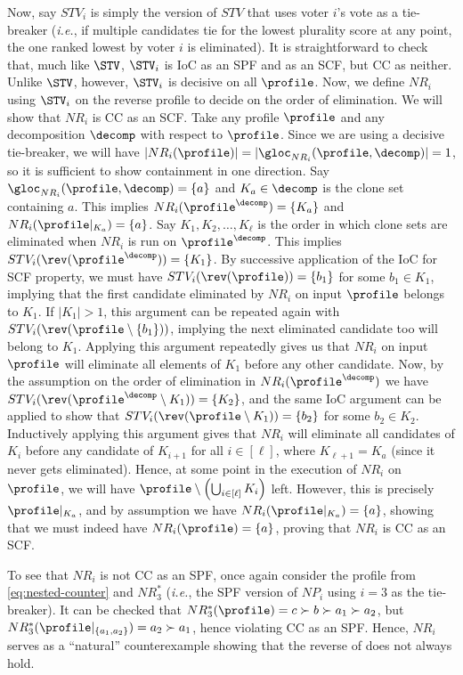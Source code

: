 Now, say $STV_i$ is simply the version of $STV$ that uses voter $i$'s vote as a tie-breaker (\emph{i.e.}, if multiple candidates tie for the lowest plurality score at any point, the one ranked lowest by voter $i$ is eliminated). It is straightforward to check that, much like $\STV$, $\STV_i$ is IoC as an SPF and as an SCF, but CC as neither. Unlike $\STV$, however, $\STV_i$ is decisive on all $\profile$. Now, we define $NR_i$ using $\STV_i$ on the reverse profile to decide on the order of elimination. We will show that $NR_i$ is CC as an SCF. Take any profile $\profile$ and any decomposition $\decomp$ with respect to $\profile$. Since we are using a decisive tie-breaker, we will have $|NR_{i}(\profile)|= |\gloc_{NR_i}(\profile, \decomp)|=1$, so it is sufficient to show containment in one direction. Say $\gloc_{NR_i}(\profile, \decomp)=\{a\}$ and $K_a \in \decomp$ is the clone set containing $a$. This implies $NR_i(\profile^{\decomp}) = \{K_a\}$ and $NR_i(\profile|_{K_a})=\{a\}$. Say $K_1,K_2,\ldots,K_{\ell}$ is the order in which clone sets are eliminated when $NR_i$ is run on $\profile^{\decomp}$. This implies $STV_i(\rev(\profile^{\decomp}))=\{K_1\}$. By successive application of the IoC for SCF property, we must have $STV_i(\rev(\profile))=\{b_1\}$ for some $b_1 \in K_1$, implying that the first candidate eliminated by $NR_i$ on input $\profile$ belongs to $K_1$. If $|K_1|>1$, this argument can be repeated again with $STV_i(\rev(\profile \setminus\{b_1\}))$, implying the next eliminated candidate too will belong to $K_1$. Applying this argument repeatedly gives us that $NR_i$ on input $\profile$ will eliminate all elements of $K_1$ before any other candidate. Now, by the assumption on the order of elimination in $NR_i(\profile^{\decomp})$ we have $STV_i(\rev(\profile^{\decomp} \setminus K_1))=\{K_2\}$, and the same IoC argument can be applied to show that $STV_i(\rev(\profile \setminus K_1))=\{b_2\}$ for some $b_2 \in K_2$. Inductively applying this argument gives that $NR_i$ will eliminate all candidates of $K_i$ before any candidate of $K_{i+1}$ for all $i \in [\ell]$, where $K_{\ell+1}=K_a$ (since it never gets eliminated). Hence, at some point in the execution of $NR_i$ on $\profile$, we will have $\profile \setminus \left( \bigcup_{i \in [\ell]} K_i \right)$ left. However, this is precisely $\profile|_{K_a}$, and by assumption we have $NR_i(\profile|_{K_a})=\{a\}$, showing that we must indeed have $NR_i(\profile)=\{a\}$, proving that $NR_i$ is CC as an SCF. 

To see that $NR_i$ is not CC as an SPF, once again consider the profile from \eqref{eq:nested-counter} and $NR^*_{3}$ (\emph{i.e.}, the SPF version of $NP_i$ using $i=3$ as the tie-breaker). It can be checked that $NR^*_3(\profile)= c \succ b \succ a_1 \succ a_2$, but $NR^*_3(\profile|_{\{a_1,a_2\}})=a_2 \succ a_1$, hence violating CC as an SPF. Hence, $NR_i$ serves as a ``natural'' counterexample showing that the reverse of  does not always hold. 

